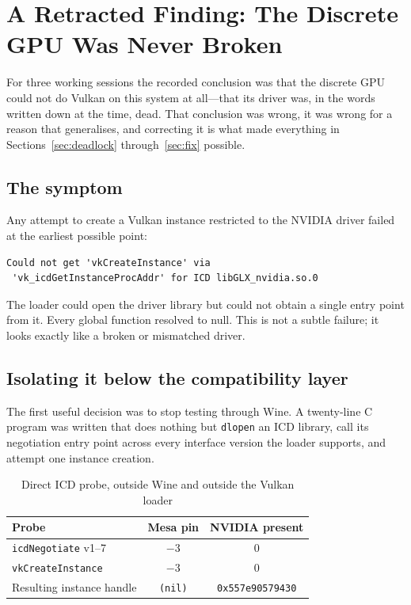 \section{A Retracted Finding: The Discrete GPU Was Never Broken}
\label{sec:egl}

For three working sessions the recorded conclusion was that the discrete GPU
could not do Vulkan on this system at all---that its driver was, in the words
written down at the time, dead. That conclusion was wrong, it was wrong for a
reason that generalises, and correcting it is what made everything in
Sections~\ref{sec:deadlock} through~\ref{sec:fix} possible.

\subsection{The symptom}

Any attempt to create a Vulkan instance restricted to the NVIDIA driver failed
at the earliest possible point:

\begin{lstlisting}
Could not get 'vkCreateInstance' via
 'vk_icdGetInstanceProcAddr' for ICD libGLX_nvidia.so.0
\end{lstlisting}

The loader could open the driver library but could not obtain a single entry
point from it. Every global function resolved to null. This is not a subtle
failure; it looks exactly like a broken or mismatched driver.

\subsection{Isolating it below the compatibility layer}

The first useful decision was to stop testing through Wine. A twenty-line C
program was written that does nothing but \verb|dlopen| an ICD library, call its
negotiation entry point across every interface version the loader supports, and
attempt one instance creation.

\begin{table}[htbp]
\caption{Direct ICD probe, outside Wine and outside the Vulkan loader}
\label{tab:icd}
\centering
\footnotesize
\begin{tabularx}{\columnwidth}{@{}L{3.4cm}cc@{}}
\toprule
\textbf{Probe} & \textbf{Mesa pin} & \textbf{NVIDIA present} \\
\midrule
\verb|icdNegotiate| v1--7 & $-3$ & $0$ \\
\verb|vkCreateInstance| & $-3$ & $0$ \\
Resulting instance handle & \verb|(nil)| & \verb|0x557e90579430| \\
\bottomrule
\end{tabularx}
\end{table}

